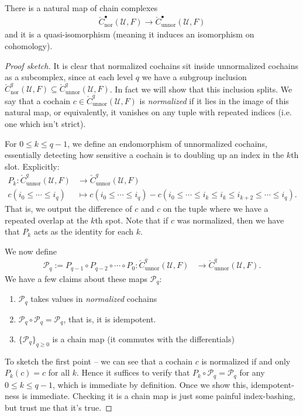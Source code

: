 \documentclass[11pt]{amsart}
\begin{document}
\begin{theorem} There is a natural map of chain complexes
\begin{align*}
    \check{C}^\bullet_\text{nor}(\mathcal{U},F) \to \check{C}^\bullet_\text{unnor}(\mathcal{U},F)
\end{align*}
and it is a quasi-isomorphism (meaning it induces an isomorphism on cohomology).
\end{theorem}
\begin{proof}[Proof sketch]
It is clear that normalized cochains sit inside unnormalized cochains as a subcomplex, since at each level $q$ we have a subgroup inclusion $\check{C}^q_\text{nor}(\mathcal{U},F) \subseteq \check{C}^q_\text{unnor}(\mathcal{U},F)$. In fact we will show that this inclusion splits. We say that a cochain $c\in \check{C}^q_\text{unnor}(\mathcal{U},F)$ is \emph{normalized} if it lies in the image of this natural map, or equivalently, it vanishes on any tuple with repeated indices (i.e. one which isn't strict).

For $0\le k\le q-1$, we define an endomorphism of unnormalized cochains, essentially detecting how sensitive a cochain is to doubling up an index in the $k$th slot. Explicitly:
\begin{align*}
    P_k \colon \check{C}^q_\text{unnor}(\mathcal{U},F) &\to \check{C}^q_\text{unnor}(\mathcal{U},F) \\
    c(i_0\le \cdots \le i_q) &\mapsto c(i_0\le \cdots \le i_q) - c(i_0 \le \cdots \le i_k \le i_k \le i_{k+2}\le \cdots \le i_q).
\end{align*}
That is, we output the difference of $c$ and $c$ on the tuple where we have a repeated overlap at the $k$th spot. Note that if $c$ was normalized, then we have that $P_k$ acts as the identity for each $k$.

We now define
\begin{align*}
    \mathcal{P}_q := P_{q-1}\circ P_{q-2} \circ \cdots \circ P_0 \colon \check{C}^q_\text{unnor}(\mathcal{U},F) &\to \check{C}^q_\text{unnor}(\mathcal{U},F).
\end{align*}
%
We have a few claims about these maps $\mathcal{P}_q$:
\begin{enumerate}
    \item $\mathcal{P}_q$ takes values in \emph{normalized} cochains
    \item $\mathcal{P}_q \circ \mathcal{P}_q = \mathcal{P}_q$, that is, it is idempotent.
    \item $\{\mathcal{P}_q\}_{q\ge0}$ is a chain map (it commutes with the differentials)
\end{enumerate}
To sketch the first point -- we can see that a cochain $c$ is normalized if and only $P_k(c)=c$ for all $k$. Hence it suffices to verify that $P_k\circ \mathcal{P}_q = \mathcal{P}_q$ for any $0\le k\le q-1$, which is immediate by definition. Once we show this, idempotent-ness is immediate. Checking it is a chain map is just some painful index-bashing, but trust me that it's true.


\end{proof}
\end{document}
